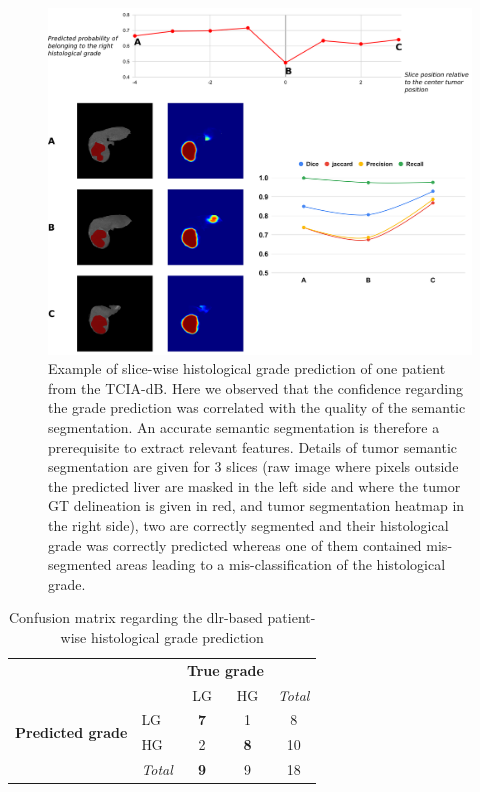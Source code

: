 \documentclass[]{article}
\renewcommand{\arraystretch}{5}
\newcommand{\lmttfont}[1]{{\fontfamily{lmtt}\selectfont #1}}
\begin{document}
\begin{figure}[th!]
	\centering
	\includegraphics[width=0.9\linewidth]{../HistologicalGradePrediction/images/Slice_hist_grad_prediction_details_v2}
	\caption{Example of slice-wise histological grade prediction of one patient from the \lmttfont{TCIA-dB}. Here we observed that the confidence regarding the grade prediction was correlated with the quality of the semantic segmentation. An accurate semantic segmentation is therefore a prerequisite to extract relevant features. Details of tumor semantic segmentation are given for 3 slices (raw image where pixels outside the predicted liver are masked in the left side and where the tumor GT delineation is given in red, and tumor segmentation heatmap in the right side), two are correctly segmented and their histological grade was correctly predicted whereas one of them contained mis-segmented areas leading to a mis-classification of the histological grade.}
	\label{fig:Slice_hist_grad_prediction_details}
\end{figure}

\renewcommand{\arraystretch}{2}
\begin{table}[!ht]
	\centering
	\caption{Confusion matrix regarding the \ac{dlr}-based patient-wise histological grade prediction}\label{tab:confusion_matrix}
	\begin{tabular}{l|l|c|c|c}
		\multicolumn{2}{c}{}&\multicolumn{2}{c}{\textbf{True grade}}&\\
		\cline{3-4}
		\multicolumn{2}{c|}{}&LG&HG&\multicolumn{1}{c}{\textit{Total}}\\
		\cline{2-4}
		\multirow{2}{*}{\textbf{Predicted grade}}& LG & \textbf{7} & 1 & 8\\
		\cline{2-4}
		& HG & 2 & \textbf{8} & 10 \\
		\cline{2-4}
		\multicolumn{1}{c}{} & \multicolumn{1}{c}{\textit{Total}} & \multicolumn{1}{c}{\textbf{9}} & \multicolumn{1}{c}{9} & \multicolumn{1}{c}{18}\\
	\end{tabular}
\end{table}
\renewcommand{\arraystretch}{5}
\end{document}
